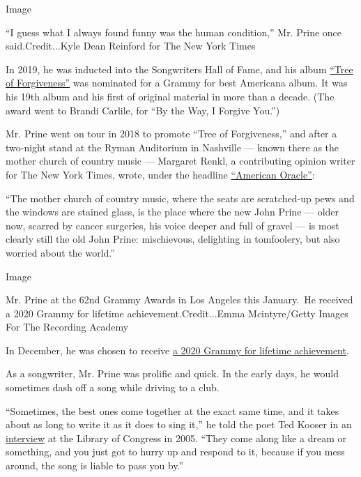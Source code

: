 Image

``I guess what I always found funny was the human condition,'' Mr. Prine
once said.Credit...Kyle Dean Reinford for The New York Times

In 2019, he was inducted into the Songwriters Hall of Fame, and his
album
\href{https://www.youtube.com/watch?v=aAYoWePzQ2c\&list=OLAK5uy_mYUVcJHLfobY-NDHtulgiqGaq_vkwc1z4}{``Tree
of Forgiveness''} was nominated for a Grammy for best Americana album.
It was his 19th album and his first of original material in more than a
decade. (The award went to Brandi Carlile, for ``By the Way, I Forgive
You.'')

Mr. Prine went on tour in 2018 to promote ``Tree of Forgiveness,'' and
after a two-night stand at the Ryman Auditorium in Nashville --- known
there as the mother church of country music --- Margaret Renkl, a
contributing opinion writer for The New York Times, wrote, under the
headline
\href{https://www.nytimes3xbfgragh.onion/2018/10/22/opinion/john-prine-american-oracle.html}{``American
Oracle''}:

``The mother church of country music, where the seats are scratched-up
pews and the windows are stained glass, is the place where the new John
Prine --- older now, scarred by cancer surgeries, his voice deeper and
full of gravel --- is most clearly still the old John Prine:
mischievous, delighting in tomfoolery, but also worried about the
world.''

Image

Mr. Prine at the 62nd Grammy Awards in Los Angeles this January.~He
received a 2020 Grammy for lifetime achievement.Credit...Emma
Mcintyre/Getty Images For The Recording Academy

In December, he was chosen to receive
\href{https://www.rollingstone.com/music/music-country/john-prine-grammy-lifetime-achievement-929523/}{a
2020 Grammy for lifetime achievement}.

As a songwriter, Mr. Prine was prolific and quick. In the early days, he
would sometimes dash off a song while driving to a club.

``Sometimes, the best ones come together at the exact same time, and it
takes about as long to write it as it does to sing it,'' he told the
poet Ted Kooser in an
\href{http://www.loc.gov/today/cyberlc/feature_wdesc.php?rec=3677}{interview}
at the Library of Congress in 2005. ``They come along like a dream or
something, and you just got to hurry up and respond to it, because if
you mess around, the song is liable to pass you by.''

